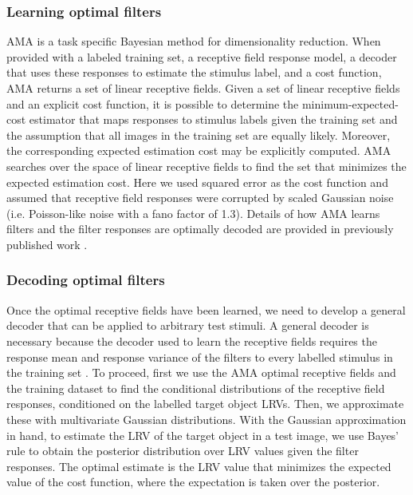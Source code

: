 \documentclass{jov}
\begin{document}
\subsubsection*{Learning optimal filters}

AMA 
is a task specific Bayesian method for dimensionality reduction.
When provided with a labeled training set, a receptive field response model, a decoder that uses these responses to estimate the stimulus label, and a cost function, AMA returns a set of linear receptive fields.
Given a set of linear receptive fields and an explicit cost function, it is possible to determine the minimum-expected-cost estimator that maps responses to stimulus labels given the training set and the 
assumption that all images in the training set are equally likely.
Moreover, the corresponding expected estimation cost may be explicitly computed.
AMA searches over the space of linear receptive fields to find the set that minimizes the expected estimation cost.
Here we used squared error as the cost function and assumed that receptive field responses were corrupted by scaled Gaussian noise (i.e. Poisson-like noise with a fano factor of 1.3).
Details of how AMA learns filters and the filter responses are optimally decoded are provided in previously published work \cite{geisler2009optimal,burge2017accuracy,jaini2017linking}.

\subsubsection*{Decoding optimal filters}

Once the optimal receptive fields have been learned, we need to develop a general decoder that can be applied to arbitrary test stimuli.
A general decoder is necessary because the decoder used to learn the receptive fields requires the response mean and response variance of the filters to every labelled stimulus in the training set \cite{geisler2009optimal,burge2017accuracy}.
To proceed, first we use the AMA optimal receptive fields and the training dataset to find the conditional distributions of the receptive field responses, conditioned on the labelled target object LRVs.
Then, we approximate these with multivariate Gaussian distributions.
With the Gaussian approximation in hand, 
to estimate the LRV of the target object in a test image, we use Bayes' rule to obtain the posterior distribution over LRV values given the filter responses.
The optimal estimate is the LRV value that minimizes the expected value of the cost function, where the expectation is taken over the posterior.
\end{document}
